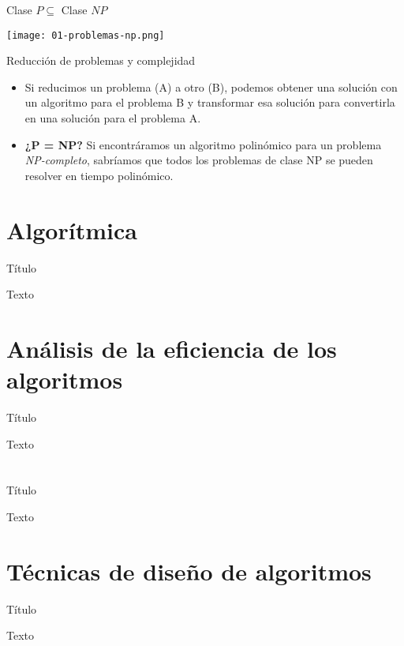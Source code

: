 \begin{frame}[c]{Clase $P \subseteq $ Clase $ NP$}
  \begin{center}
    \texttt{[image: 01-problemas-np.png]}
  \end{center}
\end{frame}

\begin{frame}[c]{Reducción de problemas y complejidad}
  \begin{itemize}
    \item Si reducimos un problema (A) a otro (B), podemos obtener una solución
      con un algoritmo para el problema B y transformar esa solución para
      convertirla en una solución para el problema A.
    \item \textbf{¿P = NP?} Si encontráramos un algoritmo polinómico para un
      problema \textit{NP-completo}, sabríamos que todos los problemas de clase
      NP se pueden resolver en tiempo polinómico.
  \end{itemize}
\end{frame}

\section{Algorítmica}

\begin{frame}[c]{Título}
    \begin{center}
        Texto
    \end{center}
\end{frame}

\section{Análisis de la eficiencia de los algoritmos}

\begin{frame}[c]{Título}
    \begin{center}
        Texto
    \end{center}
\end{frame}

\section{}

\begin{frame}[c]{Título}
    \begin{center}
        Texto
    \end{center}
\end{frame}

\section{Técnicas de diseño de algoritmos}

\begin{frame}[c]{Título}
    \begin{center}
        Texto
    \end{center}
\end{frame}
